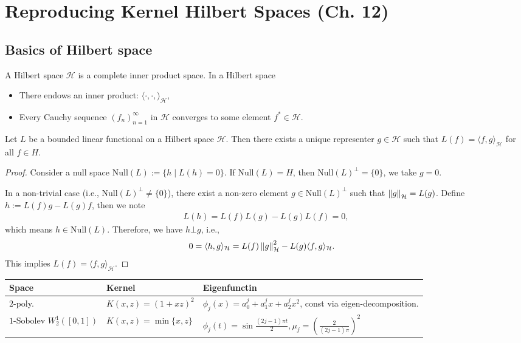 \section{Reproducing Kernel Hilbert Spaces (Ch. 12)}
\subsection{Basics of Hilbert space}

\begin{definition}
A Hilbert space $\mathcal{H}$ is a complete inner product space. In a Hilbert space
\begin{itemize}
    \item There endows an inner product: $\langle \cdot, \cdot, \rangle_\mathcal{H}$,
    \item Every Cauchy sequence $(f_n)_{n=1}^\infty$ in $\mathcal{H}$ converges to some element $f^* \in \mathcal{H}$.
\end{itemize}
\end{definition}

\begin{theorem}
Let $L$ be a bounded linear functional on a Hilbert space $\mathcal{H}$. Then there exists a unique representer $g\in \mathcal{H}$ such that $L(f) = \langle f, g \rangle_\mathcal{H}$ for all $f \in H$.
\end{theorem}
\begin{proof}
Consider a null space $\mathrm{Null}(L) := \{h \mid L(h) = 0\}$. If $\mathrm{Null}(L) = H$, then $\mathrm{Null}(L)^\bot = \{0\}$, we take $g = 0$. 

In a non-trivial case (i.e., $\mathrm{Null}(L)^\bot \neq \{0\}$), there exist a non-zero element $g \in \mathrm{Null}(L)^\bot$ such that $\left\lVert g \right\rVert_\mathcal{H} = L(g)$. Define $h:= L(f) g - L(g) f$, then we note
\begin{align*}
    L(h) = L(f) L(g) - L(g) L(f) = 0,
\end{align*}
which means $h \in \mathrm{Null}(L)$. Therefore, we have $h \bot g$, i.e.,
\begin{align*}
    0 & = \langle h, g \rangle_\mathcal{H} = L(f) \left\lVert g \right\rVert^2_\mathcal{H} - L(g) \langle f, g \rangle_\mathcal{H}.
\end{align*}
This implies $L(f) = \langle f, g \rangle_\mathcal{H}$.
\end{proof}
\begin{table*}[t]
\center
        \begin{tabular}{lll}
    \toprule
         Space & Kernel & Eigenfunctin  \\
    \midrule
         $2$-poly. & $K(x, z) = (1 + xz)^2$ & $\phi_j(x) = a_0^j + a_1^j x + a_2^j x^2$, const via eigen-decomposition.  \\
         $1$-Sobolev $W_2^1([0,1])$ & $K(x, z) = \min \{x, z\}$ & $\phi_j(t)=\sin \frac{(2j-1)\pi t}{2}, \mu_j = \left(\frac{2}{(2j-1)\pi} \right)^2$ \\
    \bottomrule
    \end{tabular}
\end{table*}

